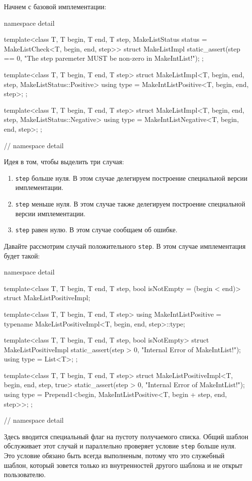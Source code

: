 Начнем с базовой имплементации:
\begin{cppcode}
namespace detail {
template<class T, T begin, T end, T step,
         MakeListStatus status = MakeListCheck<T, begin, end, step>>
struct MakeListImpl {
  static_assert(step == 0,
                "The step paremeter MUST be non-zero in MakeIntList!");
};

template<class T, T begin, T end, T step>
struct MakeListImpl<T, begin, end, step, MakeListStatus::Positive> {
  using type = MakeIntListPositive<T, begin, end, step>;
};

template<class T, T begin, T end, T step>
struct MakeListImpl<T, begin, end, step, MakeListStatus::Negative> {
  using type = MakeIntListNegative<T, begin, end, step>;
};
} // namespace detail
\end{cppcode}
Идея в том, чтобы выделить три случая:
\begin{enumerate}
\item \verb"step" больше нуля.
В этом случае делегируем построение специальной версии имплементации.

\item \verb"step" меньше нуля.
В этом случае также делегируем построение специальной версии имплементации.

\item \verb"step" равен нулю.
В этом случае сообщаем об ошибке.
\end{enumerate}
Давайте рассмотрим случай положительного \verb"step".
В этом случае имплементация будет такой:
\begin{cppcode}
namespace detail {
template<class T, T begin, T end, T step, bool isNotEmpty = (begin < end)>
struct MakeListPositiveImpl;

template<class T, T begin, T end, T step>
using MakeIntListPositive =
    typename MakeListPositiveImpl<T, begin, end, step>::type;

template<class T, T begin, T end, T step, bool isNotEmpty>
struct MakeListPositiveImpl {
  static_assert(step > 0, "Internal Error of MakeIntList!");
  using type = List<T>;
};

template<class T, T begin, T end, T step>
struct MakeListPositiveImpl<T, begin, end, step, true> {
  static_assert(step > 0, "Internal Error of MakeIntList!");
  using type = Prepend1<begin, MakeIntListPositive<T, begin + step, end, step>>;
};
} // namespace detail
\end{cppcode}
Здесь вводится специальный флаг на пустоту получаемого списка.
Общий шаблон обслуживает этот случай и параллельно проверяет условие \verb"step" больше нуля.
Это условие обязано быть всегда выполненым, потому что это служебный шаблон, который зовется только из внутренностей другого шаблона и не открыт пользователю.

